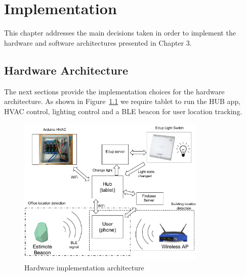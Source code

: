 \chapter{Implementation}
\label{chapter:implementation}

This chapter addresses the main decisions taken in order to implement the hardware and software architectures presented in Chapter 3.


\section{Hardware Architecture}\label{hardware_arch_imp}


The next sections provide the implementation choices for the hardware architecture. As shown in Figure~\ref{architecture_system} we require tablet to run the HUB app, HVAC control, lighting control and a \ac{BLE} beacon for user location tracking.



\begin{figure}[h]
\centering
\includegraphics[width=0.8\textwidth]{Figures/harware_arch_imp}
\caption{Hardware implementation architecture}
\label{architecture_system}
\end{figure}






